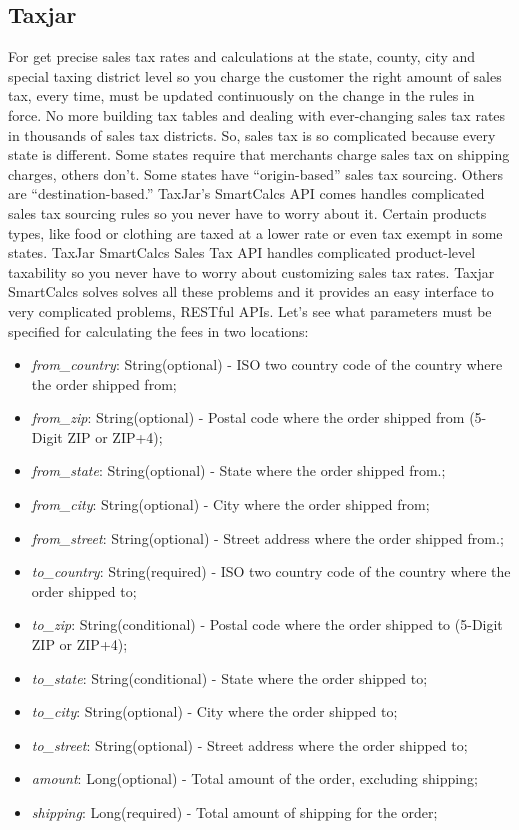 \subsection{Taxjar}
For get precise sales tax rates and calculations at the state, county, city and special taxing district level so you charge the customer the right amount of sales tax, every time, must be updated continuously on the change in the rules in force.
\newline
No more building tax tables and dealing with ever-changing sales tax rates in thousands of sales tax districts.
So, sales tax is so complicated because every state is different. Some states require that merchants charge sales tax on shipping charges, others don’t.
\newline
Some states have “origin-based” sales tax sourcing. Others are “destination-based.” TaxJar’s SmartCalcs API comes handles complicated sales tax sourcing rules so you never have to worry about it.
Certain products types, like food or clothing are taxed at a lower rate or even tax exempt in some states. TaxJar SmartCalcs Sales Tax API handles complicated product-level taxability so you never have to worry about customizing sales tax rates.
\newline
Taxjar SmartCalcs solves solves all these problems and it provides an easy interface to very complicated problems, RESTful APIs.
\newline
Let's see what parameters must be specified for calculating the fees in two locations:
\begin{itemize}
  \item \emph{from\_country}: String(optional) - ISO two country code of the country where the order shipped from;
  \item \emph{from\_zip}: String(optional) - Postal code where the order shipped from (5-Digit ZIP or ZIP+4);
  \item \emph{from\_state}: String(optional) - State where the order shipped from.;
  \item \emph{from\_city}: String(optional) - City where the order shipped from;
  \item \emph{from\_street}: String(optional) - Street address where the order shipped from.;
  \item \emph{to\_country}: String(required) - ISO two country code of the country where the order shipped to;
  \item \emph{to\_zip}: String(conditional) - Postal code where the order shipped to (5-Digit ZIP or ZIP+4);
  \item \emph{to\_state}: String(conditional) - State where the order shipped to;
  \item \emph{to\_city}: String(optional) - City where the order shipped to;
  \item \emph{to\_street}: String(optional) - Street address where the order shipped to;
  \item \emph{amount}: Long(optional) - Total amount of the order, excluding shipping;
  \item \emph{shipping}: Long(required) - Total amount of shipping for the order;
\end{itemize}
